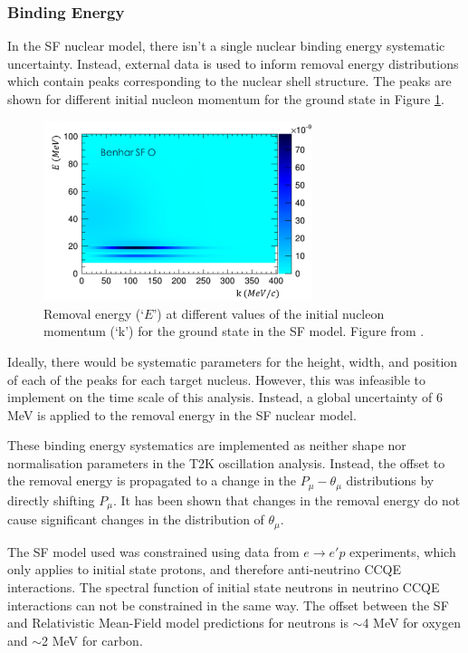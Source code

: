 \subsubsection{Binding Energy}\label{sec:eb}

In the SF nuclear model, there isn't a single nuclear binding energy systematic uncertainty. Instead, external data is used to inform removal energy distributions which contain peaks corresponding to the nuclear shell structure. The peaks are shown for different initial nucleon momentum for the ground state in Figure \ref{fig:sfshells}.

\begin{figure}[!htbp]
\centering
\includegraphics*[width=0.7\textwidth,clip]{figs/SFShells}
\caption{Removal energy (`$E$') at different values of the initial nucleon momentum (`k') for the ground state in the SF model. Figure from \cite{tn344}.}\label{fig:sfshells}
\end{figure}

Ideally, there would be systematic parameters for the height, width, and position of each of the peaks for each target nucleus. However, this was infeasible to implement on the time scale of this analysis. Instead, a global uncertainty of 6 MeV is applied to the removal energy in the SF nuclear model.

These binding energy systematics are implemented as neither shape nor normalisation parameters in the T2K oscillation analysis. Instead, the offset to the removal energy is propagated to a change in the $P_{\mu}-\theta_{\mu}$ distributions by directly shifting $P_{\mu}$. It has been shown that changes in the removal energy do not cause significant changes in the distribution of $\theta_{\mu}$.

The SF model used was constrained using data from $e\rightarrow e'p$ experiments, which only applies to initial state protons, and therefore anti-neutrino CCQE interactions. The spectral function of initial state neutrons in neutrino CCQE interactions can not be constrained in the same way. The offset between the SF and Relativistic Mean-Field model predictions \cite{RMFPred} for neutrons is $\sim$4 MeV for oxygen and $\sim$2 MeV for carbon. 

